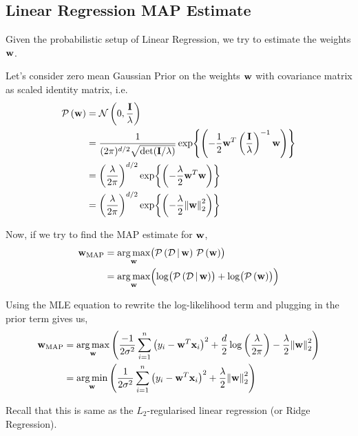 \subsection{Linear Regression MAP Estimate}

Given the probabilistic setup of Linear Regression, we try to estimate the weights $\mathbf{w}$.

Let's consider zero mean Gaussian Prior on the weights $\mathbf{w}$ with covariance matrix as scaled identity matrix, i.e.
\begin{align*}
  \mathcal{P}\left(\mathbf{w}\right) & = \mathcal{N}\left(0,\frac{\mathbf{I}}{\lambda}\right)                                                                                    \\
                             & = \frac{1}{(2\pi)^{d/2}\sqrt{\det(\mathbf{I}/\lambda)}} \exp{\left(-\frac{1}{2}\mathbf{w}^T\left(\frac{\mathbf{I}}{\lambda}\right)^{-1}\mathbf{w}\right)} \\
                             & = \left(\frac{\lambda}{2\pi}\right)^{d/2} \exp{\left(-\frac{\lambda}{2}\mathbf{w}^T\mathbf{w}\right)}                                                     \\
                             & = \left(\frac{\lambda}{2\pi}\right)^{d/2} \exp{\left(-\frac{\lambda}{2}\norm{\mathbf{w}}_2^2\right)}
\end{align*}

Now, if we try to find the MAP estimate for $\mathbf{w}$,
\begin{align*}
  \mathbf{w}_{\text{MAP}} & = \underset{\mathbf{w}}{\arg\max}
  \bigl(\mathcal{P}\left( \mathcal{D} \, | \, \mathbf{w}\right) \, \mathcal{P}\left(\mathbf{w}\right)\bigr) \\
                  & =\underset{\mathbf{w}}{\arg\max}
  \Bigl(\log\bigl(\mathcal{P}\left( \mathcal{D} \, | \, \mathbf{w}\right)\bigr) + \log\bigl(\mathcal{P}\left(\mathbf{w}\right)\bigr)\Bigr)
\end{align*}

Using the MLE equation to rewrite the log-likelihood term and plugging in the prior term gives us,
\begin{align*}
  \mathbf{w}_{\text{MAP}} & = \underset{\mathbf{w}}{\arg\max}
  \left(\frac{-1}{2\sigma^2} \sum_{i=1}^n \left(y_i - \mathbf{w}^T\mathbf{x}_i\right)^2 + \frac{d}{2}\log\left(\frac{\lambda}{2\pi}\right) - \frac{\lambda}{2}\norm{\mathbf{w}}_2^2\right) \\
                  & = \underset{\mathbf{w}}{\arg\min}
  \left(\frac{1}{2\sigma^2} \sum_{i=1}^n \left(y_i - \mathbf{w}^T\mathbf{x}_i\right)^2 + \frac{\lambda}{2}\norm{\mathbf{w}}_2^2\right)
\end{align*}

Recall that this is same as the $L_2$-regularised linear regression (or Ridge Regression).\\

